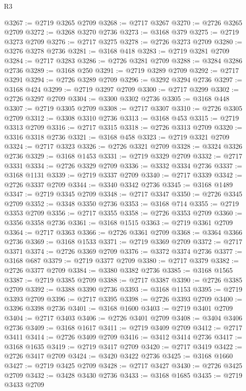 \begin{lexlean}{R3}
\begin{coremodule}
@3267 := @2719 @3265 @2709
@3268 := @2717 @3267
@3270 := @2726 @3265 @2709
@3272 := @3268 @3270 @2736
@3273 := @3168 @379
@3275 := @2719 @3273 @2709
@3276 := @2717 @3275
@3278 := @2726 @3273 @2709
@3280 := @3276 @3278 @2736
@3281 := @3168 @418
@3283 := @2719 @3281 @2709
@3284 := @2717 @3283
@3286 := @2726 @3281 @2709
@3288 := @3284 @3286 @2736
@3289 := @3168 @250
@3291 := @2719 @3289 @2709
@3292 := @2717 @3291
@3294 := @2726 @3289 @2709
@3296 := @3292 @3294 @2736
@3297 := @3168 @424
@3299 := @2719 @3297 @2709
@3300 := @2717 @3299
@3302 := @2726 @3297 @2709
@3304 := @3300 @3302 @2736
@3305 := @3168 @448
@3307 := @2719 @3305 @2709
@3308 := @2717 @3307
@3310 := @2726 @3305 @2709
@3312 := @3308 @3310 @2736
@3313 := @3168 @453
@3315 := @2719 @3313 @2709
@3316 := @2717 @3315
@3318 := @2726 @3313 @2709
@3320 := @3316 @3318 @2736
@3321 := @3168 @458
@3323 := @2719 @3321 @2709
@3324 := @2717 @3323
@3326 := @2726 @3321 @2709
@3328 := @3324 @3326 @2736
@3329 := @3168 @1453
@3331 := @2719 @3329 @2709
@3332 := @2717 @3331
@3334 := @2726 @3329 @2709
@3336 := @3332 @3334 @2736
@3337 := @3168 @1131
@3339 := @2719 @3337 @2709
@3340 := @2717 @3339
@3342 := @2726 @3337 @2709
@3344 := @3340 @3342 @2736
@3345 := @3168 @1489
@3347 := @2719 @3345 @2709
@3348 := @2717 @3347
@3350 := @2726 @3345 @2709
@3352 := @3348 @3350 @2736
@3353 := @3168 @714
@3355 := @2719 @3353 @2709
@3356 := @2717 @3355
@3358 := @2726 @3353 @2709
@3360 := @3356 @3358 @2736
@3361 := @3168 @1515
@3363 := @2719 @3361 @2709
@3364 := @2717 @3363
@3366 := @2726 @3361 @2709
@3368 := @3364 @3366 @2736
@3369 := @3168 @1533
@3371 := @2719 @3369 @2709
@3372 := @2717 @3371
@3374 := @2726 @3369 @2709
@3376 := @3372 @3374 @2736
@3377 := @3168 @687
@3379 := @2719 @3377 @2709
@3380 := @2717 @3379
@3382 := @2726 @3377 @2709
@3384 := @3380 @3382 @2736
@3385 := @3168 @1565
@3387 := @2719 @3385 @2709
@3388 := @2717 @3387
@3390 := @2726 @3385 @2709
@3392 := @3388 @3390 @2736
@3393 := @3168 @1153
@3395 := @2719 @3393 @2709
@3396 := @2717 @3395
@3398 := @2726 @3393 @2709
@3400 := @3396 @3398 @2736
@3401 := @3168 @1600
@3403 := @2719 @3401 @2709
@3404 := @2717 @3403
@3406 := @2726 @3401 @2709
@3408 := @3404 @3406 @2736
@3409 := @3168 @1617
@3411 := @2719 @3409 @2709
@3412 := @2717 @3411
@3414 := @2726 @3409 @2709
@3416 := @3412 @3414 @2736
@3417 := @3168 @1635
@3419 := @2719 @3417 @2709
@3420 := @2717 @3419
@3422 := @2726 @3417 @2709
@3424 := @3420 @3422 @2736
@3425 := @3168 @1660
@3427 := @2719 @3425 @2709
@3428 := @2717 @3427
@3430 := @2726 @3425 @2709
@3432 := @3428 @3430 @2736
@3433 := @3168 @1685
@3435 := @2719 @3433 @2709

\end{coremodule}
\end{lexlean}
